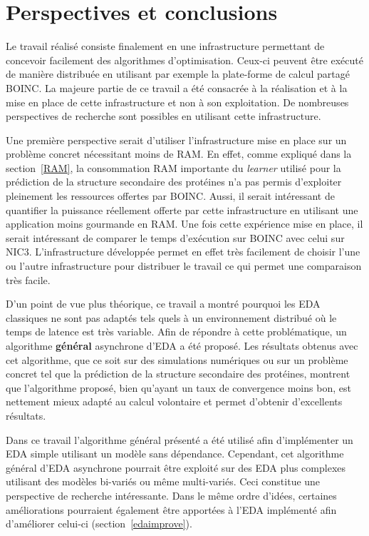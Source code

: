 \documentclass[a4paper, 12pt]{report}
\begin{document}
\chapter{Perspectives et conclusions}
\minitoc
\label{conclusions}
Le travail réalisé consiste finalement en une infrastructure permettant de concevoir facilement des algorithmes d'optimisation. Ceux-ci peuvent être exécuté de manière distribuée en utilisant par exemple la plate-forme de calcul partagé \textsc{BOINC}. La majeure partie de ce travail a été consacrée à la réalisation et à la mise en place de cette infrastructure et non à son exploitation. De nombreuses perspectives de recherche sont possibles en utilisant cette infrastructure.

Une première perspective serait d'utiliser l'infrastructure mise en place sur un problème concret nécessitant moins de RAM. En effet, comme expliqué dans la section~\ref{RAM}, la consommation RAM importante du \textit{learner} utilisé pour la prédiction de la structure secondaire des protéines n'a pas permis d'exploiter pleinement les ressources offertes par \textsc{BOINC}. Aussi, il serait intéressant de quantifier la puissance réellement offerte par cette infrastructure en utilisant une application moins gourmande en RAM. Une fois cette expérience mise en place, il serait intéressant de comparer le temps d'exécution sur \textsc{BOINC} avec celui sur \textsc{NIC3}. L'infrastructure développée permet en effet très facilement de choisir l'une ou l'autre infrastructure pour distribuer le travail ce qui permet une comparaison très facile.

D'un point de vue plus théorique, ce travail a montré pourquoi les EDA classiques ne sont pas adaptés tels quels à un environnement distribué où le temps de latence est très variable. Afin de répondre à cette problématique, un algorithme \textbf{général} asynchrone d'EDA a été proposé. Les résultats obtenus avec cet algorithme, que ce soit sur des simulations numériques ou sur un problème concret tel que la prédiction de la structure secondaire des protéines, montrent que l'algorithme proposé, bien qu'ayant un taux de convergence moins bon, est nettement mieux adapté au calcul volontaire et permet d'obtenir d'excellents résultats.

Dans ce travail l'algorithme général présenté a été utilisé afin d'implémenter un EDA simple utilisant un modèle sans dépendance. Cependant, cet algorithme général d'EDA asynchrone pourrait être exploité sur des EDA plus complexes utilisant des modèles bi-variés ou même multi-variés. Ceci constitue une perspective de recherche intéressante. Dans le même ordre d'idées, certaines améliorations pourraient également être apportées à l'EDA implémenté afin d'améliorer celui-ci (section~\ref{edaimprove}).
 
\end{document}
